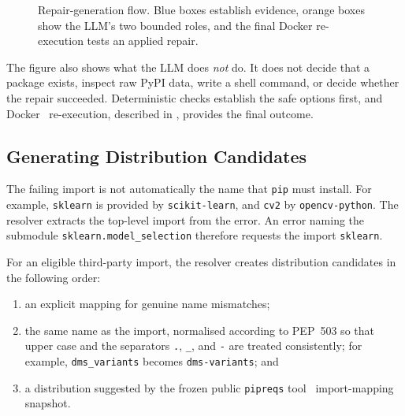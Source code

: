 \begin{figure}[htbp]
  \caption{Repair-generation flow. Blue boxes establish evidence, orange boxes show the LLM's two bounded roles, and the final Docker re-execution tests an applied repair.}
  \label{fig:m-repair-flow}
\end{figure}

The figure also shows what the LLM does \emph{not} do. It does not decide that
a package exists, inspect raw PyPI data, write a shell command, or decide whether
the repair succeeded. Deterministic checks establish the safe options first, and
Docker~\cite{dockerdocs} re-execution, described in , provides the final
outcome.

\subsection{Generating Distribution Candidates}
\label{sec:m-repair-retrieval}

The failing import is not automatically the name that \texttt{pip} must
install. For example, \texttt{sklearn} is provided by
\texttt{scikit-learn}, and \texttt{cv2} by \texttt{opencv-python}. The
resolver extracts the top-level import from the error. An error naming the
submodule \texttt{sklearn.\allowbreak model\_selection} therefore requests
the import \texttt{sklearn}.

For an eligible third-party import, the resolver creates distribution
candidates in the following order:

\begin{enumerate}
  \item an explicit mapping for genuine name mismatches;
  \item the same name as the import, normalised according to PEP~503
        \cite{pep503} so that
        upper case and the separators \texttt{.}, \texttt{\_}, and
        \texttt{-} are treated consistently; for example,
        \texttt{dms\_variants} becomes \texttt{dms-variants}; and
  \item a distribution suggested by the frozen public \texttt{pipreqs}
        tool~\cite{pipreqs}
        import-mapping snapshot.
\end{enumerate}

